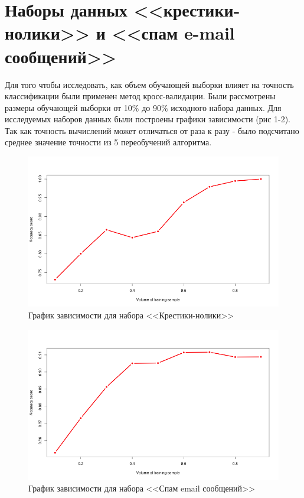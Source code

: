 \documentclass[]{article}
\numberwithin{equation}{section}
\begin{document}
    \newpage
    \section{Наборы данных <<крестики-нолики>> и <<спам e-mail сообщений>>}
        Для того чтобы исследовать, как объем обучающей выборки влияет на точность классификации были применен метод кросс-валидации. Были рассмотрены размеры обучающей выборки от 10$\%$ до 90$\%$ исходного набора данных. Для исследуемых наборов данных были построены графики зависимости (рис 1-2). Так как точность вычислений может отличаться от раза к разу - было подсчитано среднее значение точности из 5 переобучений алгоритма.
        \vspace{-0.5cm}
        \begin{figure}[H]
            \centering
            \includegraphics[width = 0.8\linewidth]{data/tic_tac_toe.png}
            \caption{График зависимости для набора <<Крестики-нолики>>}
        \end{figure}
        \vspace{-1cm}
        \begin{figure}[H]
            \centering
            \includegraphics[width = 0.8\linewidth]{data/email.png}
            \caption{График зависимости для набора <<Спам email сообщений>>}
        \end{figure}
\end{document}
